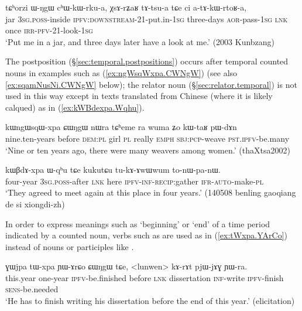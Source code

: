 \begin{exe}
\ex \label{ex:tAtsua}
\gll  tɕʰorzi ɯ-ŋgɯ cʰɯ-kɯ-rku-a, χsɤ-rʑaʁ tɤ-tsu-a tɕe ci a-tɤ-kɯ-rtoʁ-a, \\
jar \textsc{3sg}.\textsc{poss}-inside \textsc{ipfv}:\textsc{downstream}-2\fl{}1-put.in-\textsc{1sg} three-days \textsc{aor}-pass-\textsc{1sg} \textsc{lnk} once \textsc{irr}-\textsc{pfv}-2\fl{}1-look-\textsc{1sg} \\
\glt `Put me in a jar, and three days later have a look at me.' (2003 Kunbzang)
\end{exe} 

The postposition  (§\ref{sec:temporal.postpositions}) occurs after temporal counted nouns in examples such as (\ref{ex:ngWsqWxpa.CWNgW}) (see also \ref{ex:sqamNusNi.CWNgW}  below); the relator noun  (§\ref{sec:relator.temporal}) is not used in this way except in texts translated from Chinese (where it is likely calqued) as in (\ref{ex:kWBdexpa.Wqhu}).

\begin{exe}
\ex \label{ex:ngWsqWxpa.CWNgW}
 \gll kɯngɯsqɯ-xpa ɕɯŋgɯ nɯra tɕʰeme ra wuma ʑo kɯ-taʁ pɯ-dɤn \\
nine.ten-years before \textsc{dem}:\textsc{pl} girl \textsc{pl} really \textsc{emph} \textsc{sbj}:\textsc{pcp}-weave \textsc{pst}.\textsc{ipfv}-be.many \\
 \glt `Nine or ten years ago, there were many weavers among women.' (thaXtsa2002)
\end{exe}

\begin{exe}
\ex \label{ex:kWBdexpa.Wqhu}
\gll  kɯβdɤ-xpa ɯ-qʰu tɕe kukutɕu tu-kɤ-ɤwɯwum to-nɯ-pa-nɯ. \\
four-year \textsc{3sg}.\textsc{poss}-after \textsc{lnk} here \textsc{ipfv}-\textsc{inf}-\textsc{recip}:gather \textsc{ifr}-\textsc{auto}-make-\textsc{pl} \\
\glt `They agreed to meet again at this place in four years.' (140508 benling gaoqiang de si xiongdi-zh)
\end{exe} 

In order to express meanings such as `beginning' or `end' of a time period indicated by a counted noun, verbs such as  are used as in (\ref{ex:tWxpa.YArCo}) instead of nouns or participles like .

\begin{exe}
\ex \label{ex:tWxpa.YArCo}
\gll ɣɯjpa tɯ-xpa ɲɯ-ɤrɕo ɕɯŋgɯ tɕe, <lunwen> kɤ-rɤt pjɯ-jɤɣ ɲɯ-ra. \\
this.year one-year \textsc{ipfv}-be.finished  before \textsc{lnk} dissertation \textsc{inf}-write \textsc{ipfv}-finish \textsc{sens}-be.needed \\
\glt `He has to finish writing his dissertation before the end of this year.' (elicitation)
\end{exe} 

